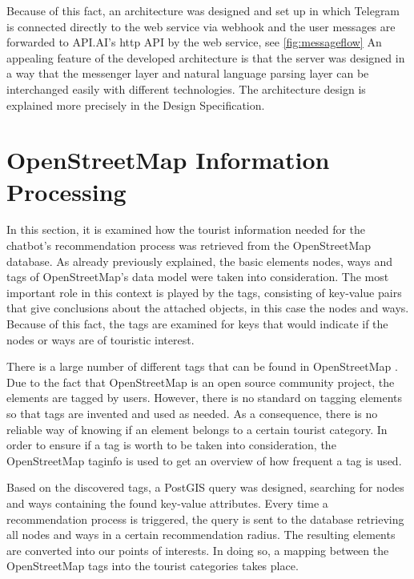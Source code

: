 
Because of this fact, an architecture was designed and set up in which Telegram is connected directly to the web service via webhook and the user messages are forwarded to API.AI’s http API by the web service, see \ref{fig:messageflow} An appealing feature of the developed architecture is that the server was designed in a way that the messenger layer and natural language parsing layer can be interchanged easily with different technologies. The architecture design is explained more precisely in the Design Specification.


\section{OpenStreetMap Information Processing}
In this section, it is examined how the tourist information needed for the chatbot’s recommendation process was retrieved from the OpenStreetMap database. As already previously explained, the basic elements nodes, ways and tags of OpenStreetMap’s data model were taken into consideration. The most important role in this context is played by the tags, consisting of key-value pairs that give conclusions about the attached objects, in this case the nodes and ways. Because of this fact, the tags are examined for keys that would indicate if the nodes or ways are of touristic interest.

There is a large number of different tags that can be found in OpenStreetMap \cite{osm:map_features}. Due to the fact that OpenStreetMap is an open source community project, the elements are tagged by users. However, there is no standard on tagging elements so that tags are invented and used as needed. As a consequence, there is no reliable way of knowing if an element belongs to a certain tourist category. In order to ensure if a tag is worth to be taken into consideration, the OpenStreetMap taginfo \cite{osm:taginfo} is used to get an overview of how frequent a tag is used.

Based on the discovered tags, a PostGIS query was designed, searching for nodes and ways containing the found key-value attributes. Every time a recommendation process is triggered, the query is sent to the database retrieving all nodes and ways in a certain recommendation radius. The resulting elements are converted into our points of interests. In doing so, a mapping between the OpenStreetMap tags into the tourist categories takes place.

